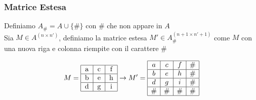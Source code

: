 \documentclass{beamer}
\begin{document}



\begin{frame}
\frametitle{Matrice Estesa}

\begin{definition}
Definiamo $A_\# = A \cup\{\#\}$ con $\#$ che non appare in $A$\\
Sia $M \in A^{(n\times n')}$, definiamo la matrice estesa $M' \in A_\# ^{(n+1 \times n'+1)}$ come $M$ con una nuova riga e colonna riempite con il carattere $\#$
\end{definition}

\[
  M = \begin{tabular} {|c|c|c|}
  	\hline
  		a & c & f  \\ 
  		\hline
  		b & e & h \\
  		\hline
  		d & g & i \\
  		\hline 
  \end{tabular} 
  \to M' = 
 \begin{array} {|c|c|c|c|}
 \hline
   		a & c & f & \# \\ 
   		\hline
   		b & e & h & \# \\
   		\hline
   		d & g & i  & \# \\
   		\hline
   		\# & \# & \# & \#\\
		\hline
   \end{array} 
\]


\end{frame}
\end{document}
